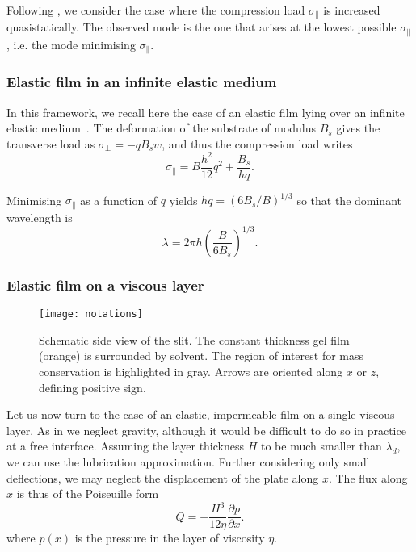 \documentclass[twocolumn,superscriptaddress,showpacs,preprintnumbers,
amsmath,amssymb,prl]{revtex4-1}
\begin{document}
Following \cite{Biot1957}, we consider the case where the compression load $\sigma_\parallel$ is increased quasistatically. The observed mode is the one that arises at the lowest possible $\sigma_\parallel$, i.e. the mode minimising $\sigma_\parallel$.

\subsubsection*{Elastic film in an infinite elastic medium}

In this framework, we recall here the case of an elastic film lying over an infinite elastic medium~\cite{Gough1940,Bijlaard1946,Biot1957,Cerda2003}. The deformation of the substrate of modulus $B_s$ gives the transverse load as $\sigma_\perp = -q B_s w$, and thus the compression load writes
\begin{equation}
\sigma_\parallel = B \frac{h^2}{12} q^2 + \frac{B_s}{hq}.
\label{eq:sigma0}
\end{equation}

Minimising $\sigma_\parallel$ as a function of $q$ yields $hq = \left(6B_s/B\right)^{1/3}$ \cite{Biot1957,Cerda2003} so that the dominant wavelength is 
\begin{equation}
\lambda = 2\pi h \left(\frac{B}{6B_s}\right)^{1/3}.
\label{eq:lambdaElEl}
\end{equation}

\subsubsection*{Elastic film on a viscous layer}

\begin{figure}
\texttt{[image: notations]}%
\caption{Schematic side view of the slit. The constant thickness gel film (orange) is surrounded by solvent. The region of interest for mass conservation is highlighted in gray. Arrows are oriented along $x$ or $z$, defining positive sign.}%
\label{fig:notations}%
\end{figure}

Let us now turn to the case of an elastic, impermeable film on a single viscous layer. As in \cite{Huang2002} we neglect gravity, although it would be difficult to do so in practice at a free interface. Assuming the layer thickness $H$ to be much smaller than $\lambda_d$, we can use the lubrication approximation. Further considering only small deflections, we may neglect the displacement of the plate along $x$. The flux along $x$ is thus of the Poiseuille form
\begin{equation}
Q = -\frac{H^3}{12\eta}\frac{\partial p}{\partial x}.
\label{eq:PoiseuilleFlux}
\end{equation}
where $p(x)$ is the pressure in the layer of viscosity $\eta$.
\end{document}
